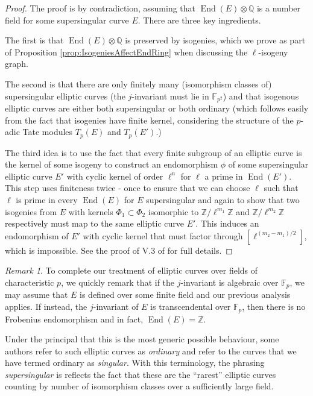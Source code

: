 \documentclass{amsart}
\theoremstyle{definition}
\theoremstyle{remark}
\newtheorem{remark}[thm]{Remark}
\numberwithin{equation}{section}
\newcommand{\bbF}{\mathbb F}
\newcommand{\bbQ}{\mathbb Q}
\newcommand{\bbZ}{\mathbb Z}
\DeclareMathOperator{\End}{End}
\begin{document}
\begin{proof}
 The proof is by contradiction, assuming that $\End(E) \otimes \bbQ$ is a number field for some supersingular curve $E$. There are three key ingredients.
 
 The first is that $\End(E) \otimes \bbQ$ is preserved by isogenies, which we prove as part of Proposition \ref{prop:IsogeniesAffectEndRing} when discussing the $\ell$-isogeny graph.


The second is that there are only finitely many (isomorphism classes of) supersingular elliptic curves (the $j$-invariant must lie in $\bbF_{p^2}$)
and that isogenous elliptic curves are either both supersingular or both ordinary (which follows easily from the fact that isogenies have finite kernel, considering the structure of the $p$-adic Tate modules $T_{p}(E)$ and $T_{p}(E')$.) 

 The third idea is to use the fact that every finite subgroup of an elliptic curve is the kernel of some isogeny to construct an endomorphism $\phi$ of some supersingular elliptic curve $E'$ with cyclic kernel of order $\ell^n$ for $\ell$ a prime in $\End(E')$. This step uses finiteness twice - once to ensure that we can choose $\ell$ such that $\ell$ is prime in every $\End(E)$ for $E$ supersingular and again to show that two isogenies from $E$ with kernels $\Phi_{1} \subset \Phi_{2}$ isomorphic to $\bbZ/\ell^{m_1}\bbZ$ and $\bbZ/\ell^{m_2}\bbZ$ respectively must map to the same elliptic curve $E'$. This induces an endomorphism of $E'$ with cyclic kernel that must factor through $[\ell^{(m_{2} - m_{1})/2}]$, which is impossible. See the proof of V.3 of \cite{SilvermanAEC} for full details.
\end{proof}

\begin{remark}
To complete our treatment of elliptic curves over fields of characteristic $p$, we quickly remark that if the $j$-invariant is algebraic over $\bbF_{p}$, we may assume that $E$ is defined over some finite field and our previous analysis applies. If instead, the $j$-invariant of $E$ %
is transcendental over $\bbF_{p}$, then there is no Frobenius endomorphism and in fact, $\End(E) = \bbZ$.

Under the principal that this is the most generic possible behaviour, some authors refer to such elliptic curves as \emph{ordinary} and refer to the curves that we have termed ordinary as \emph{singular}. With this terminology, the phrasing \emph{supersingular} is reflects the fact that these are the ``rarest'' elliptic curves counting by number of isomorphism classes over a sufficiently large field. 
\end{remark}
\end{document}
